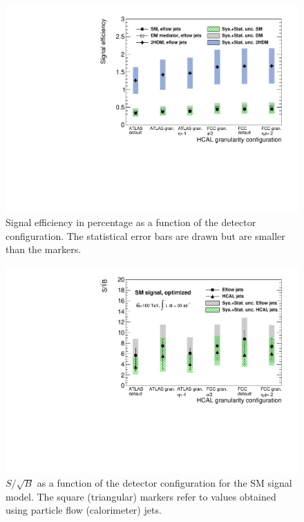 \begin{figure}[h]
	\centering
	\includegraphics[width=\linewidth]{./images/EffvsGran_PFjets_Opt.pdf}
	\caption{Signal efficiency in percentage as a function of the detector configuration. The statistical error bars are drawn but are smaller than the markers.}
	\label{fig:eff_gran}
\end{figure}

\begin{figure}[h]
	\centering
	\includegraphics[width=\linewidth]{./images/SSBvsGran_SM_Opt.pdf}
	\caption{$S/\sqrt{B}$ as a function of the detector configuration for the SM signal model. The square (triangular) markers refer to values obtained using particle flow (calorimeter) jets.}
	\label{fig:SSB_gran}
\end{figure}

